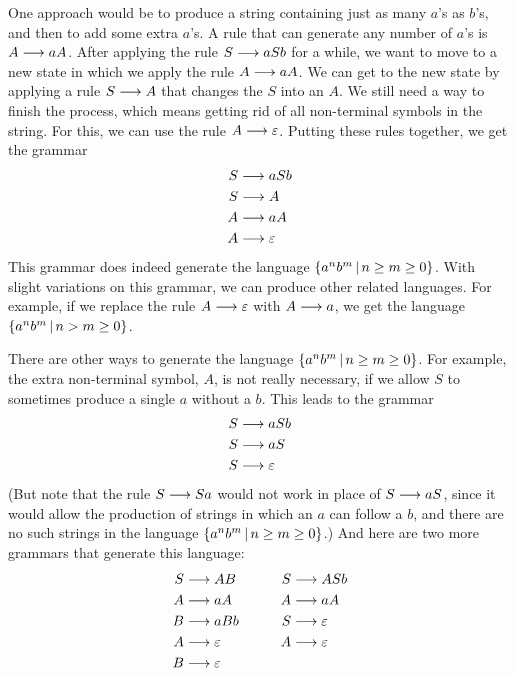One approach would be to produce a string containing just as many
$a$'s as $b$'s, and then to add some extra $a$'s.  A rule that can
generate any number of $a$'s is $A\longrightarrow aA$. After
applying the rule $S\longrightarrow aSb$ for a while, we want to move
to a new state in which we apply the rule $A\longrightarrow aA$.  We can
get to the new state by applying a rule $S\longrightarrow A$
that changes the $S$ into an $A$.  We still need a way to 
finish the process, which means getting rid of all non-terminal
symbols in the string.  For this, we can use the rule $A\longrightarrow\varepsilon$.
Putting these rules together, we get the grammar
\begin{align*}
      S&\longrightarrow aSb\\
      S&\longrightarrow A\\
      A&\longrightarrow aA\\
      A&\longrightarrow \varepsilon
\end{align*}
This grammar does indeed generate the language $\{a^nb^m\,|\, n\ge m\ge 0\}$.
With slight variations on this grammar, we can produce other related
languages.  For example, if we replace the rule $A\longrightarrow \varepsilon$
with $A\longrightarrow a$, we get the language $\{a^nb^m\,|\, n> m\ge 0\}$.

There are other ways to generate the language $\{a^nb^m\,|\, n\ge m\ge 0\}$.
For example, the extra non-terminal symbol, $A$, is not really necessary,
if we allow $S$ to sometimes produce a single $a$ without a $b$.  This
leads to the grammar
\begin{align*}
      S&\longrightarrow aSb\\
      S&\longrightarrow aS\\
      S&\longrightarrow \varepsilon
\end{align*}
(But note that the rule $S\longrightarrow Sa$ would not work in place
of $S\longrightarrow aS$, since it would allow the production of
strings in which an $a$ can follow a $b$, and there are no
such strings in the language $\{a^nb^m\,|\, n\ge m\ge 0\}$.)
And here are two more grammars that generate this language:
\begin{align*}
      S&\longrightarrow AB             &\qquad S&\longrightarrow ASb\\
      A&\longrightarrow aA             &\qquad A&\longrightarrow aA\\
      B&\longrightarrow aBb            &\qquad S&\longrightarrow\varepsilon\\
      A&\longrightarrow \varepsilon   &\qquad A&\longrightarrow\varepsilon\\
      B&\longrightarrow \varepsilon   &\qquad  &
\end{align*}

